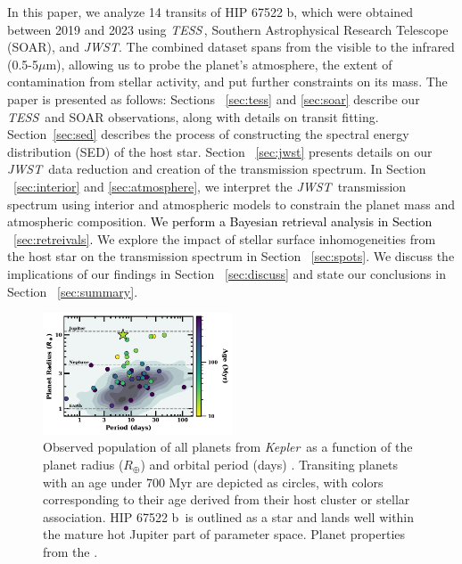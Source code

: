 \documentclass[twocolumn]{aastex63} %
\newcommand{\kepler}{{\it Kepler}}
\newcommand{\tess}{\textit{TESS}}
\newcommand{\jwst}{\textit{JWST}}
\newcommand{\plname}{HIP 67522 b}
\newcommand{\newedit}[1]{\textcolor{black}{#1}}
\begin{document}
In this paper, we analyze 14 transits of \plname, which were obtained between 2019 and 2023 using \tess\,, Southern Astrophysical Research Telescope (SOAR), and \jwst. The combined dataset spans from the visible to the infrared (0.5-5$\mu$m), allowing us to probe the planet's atmosphere, the extent of contamination from stellar activity, and put further constraints on its mass. The paper is presented as follows: Sections ~\ref{sec:tess} and \ref{sec:soar} describe our \tess\, and SOAR observations, along with details on transit fitting. Section~\ref{sec:sed} describes the process of constructing the spectral energy distribution (SED) of the host star. Section ~\ref{sec:jwst} presents details on our \jwst\, data reduction and creation of the transmission spectrum. In Section ~\ref{sec:interior} and \ref{sec:atmosphere}, we interpret the \jwst\, transmission spectrum using interior and atmospheric models to constrain the planet mass and atmospheric composition. \newedit{We perform a Bayesian retrieval analysis in Section ~\ref{sec:retreivals}.} We explore the impact of stellar surface inhomogeneities from the host star on the transmission spectrum in Section ~\ref{sec:spots}. We discuss the implications of our findings in Section ~\ref{sec:discuss} and state our conclusions in Section ~\ref{sec:summary}. %

\begin{figure}[ht]
    \centering
    \includegraphics[width=0.5\textwidth]{HIP67522b_youngpl_kepler.pdf}
    \caption{ Observed population of all planets from \kepler\,  as a function of the planet radius ($R_{\oplus}$) and orbital period (days) \citep{Dattilo2023}. Transiting planets with an age under 700 Myr are depicted as circles, with colors corresponding to their age derived from their host cluster or stellar association. \plname\, is outlined as a star and lands well within the mature hot Jupiter part of parameter space. Planet properties from the \citet{NASAexplanetarchive}. 
    \label{fig:young_pl}}
\end{figure} 
\end{document}
